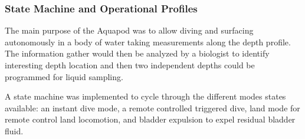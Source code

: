 \subsubsection{State Machine and Operational Profiles}
The main purpose of the Aquapod was to allow diving and surfacing autonomously in a body of water taking measurements along the depth profile. The information gather would then be analyzed by a biologist to identify interesting depth location and then two independent depths could be programmed for liquid sampling. 

A state machine was implemented to cycle through the different modes states available: an instant dive mode, a remote controlled triggered dive, land mode for remote control land locomotion, and bladder expulsion to expel residual bladder fluid. 







